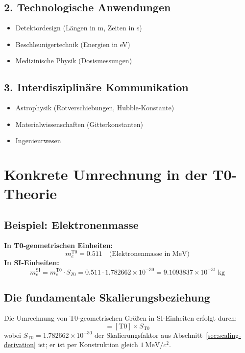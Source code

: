 	\subsection{2. Technologische Anwendungen}
	\begin{itemize}
		\item Detektordesign (Längen in m, Zeiten in s)
		\item Beschleunigertechnik (Energien in eV)
		\item Medizinische Physik (Dosismessungen)
	\end{itemize}
	
	\subsection{3. Interdisziplinäre Kommunikation}
	\begin{itemize}
		\item Astrophysik (Rotverschiebungen, Hubble-Konstante)
		\item Materialwissenschaften (Gitterkonstanten)
		\item Ingenieurwesen
	\end{itemize}
	
	\section{Konkrete Umrechnung in der T0-Theorie}
	\label{sec:umrechnung}
	
	\subsection{Beispiel: Elektronenmasse}
	\textbf{In T0-geometrischen Einheiten:}
	\begin{equation}
		m_e^{\mathrm{T0}} = 0.511 \quad \text{(Elektronenmasse in MeV)}
	\end{equation}
	\textbf{In SI-Einheiten:}
	\begin{equation}
		m_e^{\mathrm{SI}} = m_e^{\mathrm{T0}} \cdot S_{T0} = 0.511 \cdot 1.782662 \times 10^{-30} = 9.1093837 \times 10^{-31}~\mathrm{kg}
	\end{equation}
	
	\subsection{Die fundamentale Skalierungsbeziehung}
	Die Umrechnung von T0-geometrischen Größen in SI-Einheiten erfolgt durch:
	\begin{equation}
		[\mathrm{SI}] = [\mathrm{T0}] \times S_{\text{T0}}
	\end{equation}
	wobei $S_{\text{T0}} = 1.782662 \times 10^{-30}$ der Skalierungsfaktor aus Abschnitt~\ref{sec:scaling-derivation} ist; er ist per Konstruktion gleich $1~\mathrm{MeV}/c^2$.
	
